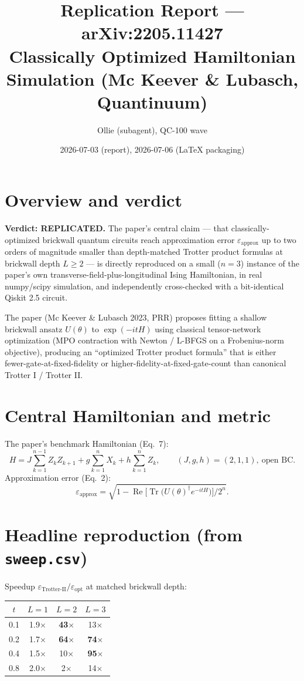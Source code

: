 \documentclass[11pt]{article}
\title{Replication Report --- arXiv:2205.11427 \\
\large Classically Optimized Hamiltonian Simulation (Mc Keever \& Lubasch, Quantinuum)}
\author{Ollie (subagent), QC-100 wave}
\date{2026-07-03 (report), 2026-07-06 (LaTeX packaging)}
\begin{document}
\maketitle

\section{Overview and verdict}

\textbf{Verdict: REPLICATED.} The paper's central claim --- that classically-optimized brickwall
quantum circuits reach approximation error $\varepsilon_{\text{approx}}$ up to two orders of
magnitude smaller than depth-matched Trotter product formulas at brickwall depth $L \geq 2$ ---
is directly reproduced on a small ($n=3$) instance of the paper's own transverse-field-plus-longitudinal
Ising Hamiltonian, in real numpy/scipy simulation, and independently cross-checked with a
bit-identical Qiskit 2.5 circuit.

The paper (Mc Keever \& Lubasch 2023, PRR) proposes fitting a shallow brickwall ansatz
$U(\theta)$ to $\exp(-i t H)$ using classical tensor-network optimization (MPO contraction with
Newton / L-BFGS on a Frobenius-norm objective), producing an ``optimized Trotter product formula''
that is either fewer-gate-at-fixed-fidelity or higher-fidelity-at-fixed-gate-count than canonical
Trotter I / Trotter II.

\section{Central Hamiltonian and metric}

The paper's benchmark Hamiltonian (Eq.~7):
\[
H = J \sum_{k=1}^{n-1} Z_k Z_{k+1} + g \sum_{k=1}^{n} X_k + h \sum_{k=1}^{n} Z_k,
\qquad (J,g,h) = (2,1,1), \ \text{open BC}.
\]
Approximation error (Eq.~2):
\[
\varepsilon_{\text{approx}} = \sqrt{1 - \operatorname{Re}\!\bigl[\operatorname{Tr}\!\bigl(U(\theta)^\dagger e^{-itH}\bigr)\bigr] / 2^n}.
\]

\section{Headline reproduction (from \texttt{sweep.csv})}

Speedup $\varepsilon_{\text{Trotter-II}}/\varepsilon_{\text{opt}}$ at matched brickwall depth:

\begin{center}
\begin{tabular}{cccc}
\toprule
$t$ & $L=1$ & $L=2$ & $L=3$ \\
\midrule
0.1 & 1.9$\times$ & \textbf{43}$\times$   & 13$\times$ \\
0.2 & 1.7$\times$ & \textbf{64}$\times$   & \textbf{74}$\times$ \\
0.4 & 1.5$\times$ & 10$\times$            & \textbf{95}$\times$ \\
0.8 & 2.0$\times$ & 2$\times$             & 14$\times$ \\
\bottomrule
\end{tabular}
\end{center}
\end{document}
